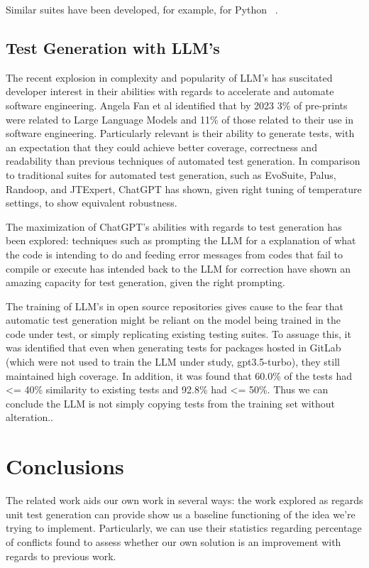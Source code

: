 Similar suites have been developed, for example, for Python ~\citep{kn:pynguin}.

\subsection{Test Generation with LLM's}

The recent explosion in complexity and popularity of LLM's has suscitated developer interest in their abilities with regards to accelerate and automate software engineering. Angela Fan et al identified that by 2023 3\% of pre-prints were related to Large Language Models and 11\% of those related to their use in software engineering.\cite{kn:angela} Particularly relevant is their ability to generate tests, with an expectation that they could achieve better coverage, correctness and readability than previous techniques of automated test generation.\cite{kn:junjiewang}
In comparison to traditional suites for automated test generation, such as EvoSuite, Palus, Randoop, and JTExpert, ChatGPT has shown, given right tuning of temperature settings, to show equivalent robustness\cite{kn:gptunitbra}.


The maximization of ChatGPT's abilities with regards to test generation has been explored: techniques such as prompting the LLM for a explanation of what the code is intending to do \cite{kn:nuances} and feeding error messages from codes that fail to compile or execute has intended back to the LLM for correction \cite{kn:chattester} have shown an amazing capacity for test generation, given the right prompting.

The training of LLM's in open source repositories gives cause to the fear that automatic test generation might be reliant on the model being trained in the code under test, or simply replicating existing testing suites. To assuage this, it was identified that even when generating tests for packages hosted in GitLab (which were not used to train the LLM under study, gpt3.5-turbo), they still maintained high coverage. In addition, it was found that 60.0\% of the tests had <= 40\% similarity to existing tests and 92.8\% had <= 50\%. Thus we can conclude the LLM is not simply copying tests from the training set without alteration.\citep{kn:max}.


\section{Conclusions}


The related work aids our own work in several ways: the work explored as regards unit test generation can provide show us a baseline functioning of the idea we're trying to implement. Particularly, we can use their statistics regarding percentage of conflicts found to assess whether our own solution is an improvement with regards to previous work.

